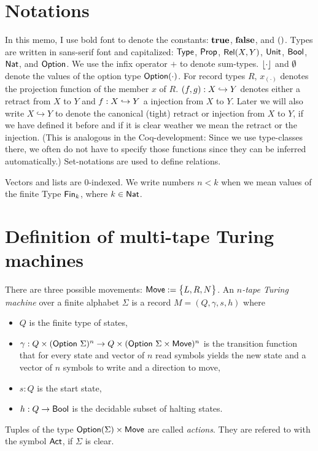 \documentclass{psartcl}
\begin{document}
\section{Notations}
In this memo, I use bold font to denote the constants: $\mathbf{true}$, $\mathbf{false}$, and $\mathbf{()}$.  Types are written in sans-serif font and capitalized: $\textsf{Type}$,
$\textsf{Prop}$, $\mathsf{Rel}(X, Y)$, $\textsf{Unit}$, $\textsf{Bool}$, $\textsf{Nat}$, and $\textsf{Option}$.  We use the infix operator $+$ to denote sum-types.  $\left\lfloor {\cdot}\right\rfloor$ and $\emptyset$ denote
the values of the option type $\textsf{Option}(\cdot)$.  For record types $R$, $x_{(\cdot)}$ denotes the projection function of the member $x$ of $R$.
$(f, g) : X \hookrightarrow Y$ denotes either a retract from $X$ to $Y$ and $f : X \hookrightarrow Y$ a injection from $X$ to $Y$.
Later we will also write $X \hookrightarrow Y$ to denote the canonical (tight) retract or injection from $X$ to $Y$, if we have defined it before and
if it is clear weather we mean the retract or the injection.  (This is analogous in the Coq-development:  Since we use type-classes there, we often
do not have to specify those functions since they can be inferred automatically.)  Set-notations are used to define relations.

Vectors and lists are $0$-indexed.  We write numbers $n < k$ when we mean values of the finite Type $\textsf{Fin}_k$, where $k\in\textsf{Nat}$.

\section{Definition of multi-tape Turing machines}
\label{sec:def}

\begin{definition}
  \label{def:mTM}
  There are three possible movements:  $\textsf{Move} := \bigl\{ L, R, N \bigr \}$.
  An \emph{$n$-tape Turing machine} over a finite alphabet $\Sigma$ is a record $M = (Q, \gamma, s, h)$ where
  \begin{itemize}
    \item $Q$ is the finite type of states,
    \item $\gamma : Q \times (\textsf{Option}~\Sigma)^n \rightarrow Q \times (\textsf{Option}~\Sigma \times \textsf{Move})^n$ is the transition function that for every state and
      vector of $n$ read symbols yields the new state and a vector of $n$ symbols to write and a direction to move,
    \item $s:Q$ is the start state,
    \item $h : Q \rightarrow \textsf{Bool}$ is the decidable subset of halting states.
  \end{itemize}

  Tuples of the type $\textsf{Option}(\Sigma) \times \textsf{Move}$ are called \emph{actions}.  They are refered to with the symbol $\textsf{Act}$, if $\Sigma$ is clear.
\end{definition}
\end{document}
